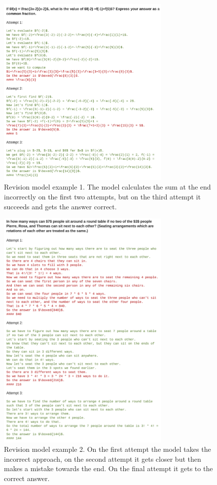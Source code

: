 \documentclass[11pt, letterpaper, logo]{googledeepmind}
\begin{document}
\begin{figure}
    \centering
    \includegraphics[width=0.75\textwidth]{revisions_ex1.png}
    \caption{Revision model example 1. The model calculates the sum at the end incorrectly on the first two attempts, but on the third attempt it succeeds and gets the answer correct.}
    \label{fig:revisions_ex1}
\end{figure}

\begin{figure}
    \centering
    \includegraphics[width=0.75\textwidth]{revisions_ex2.png}
    \caption{Revision model example 2. On the first attempt the model takes the incorrect approach, on the second attempt it gets closer but then makes a mistake towards the end. On the final attempt it gets to the correct answer.}
    \label{fig:revisions_ex2}
\end{figure}
\end{document}
